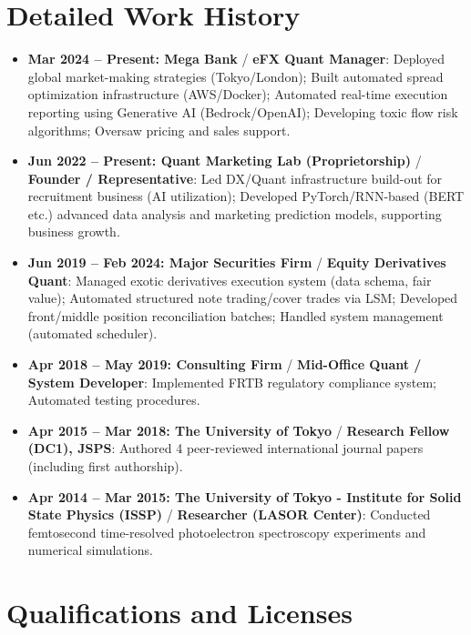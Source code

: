 \documentclass[uplatex,a4j,10.5pt,dvipdfmx]{jsarticle}
\begin{document}
\section{Detailed Work History}
\begin{itemize}[leftmargin=*]
	\item \textbf{Mar 2024 -- Present: Mega Bank} / \textbf{eFX Quant Manager}: Deployed global market-making strategies (Tokyo/London); Built automated spread optimization infrastructure (AWS/Docker); Automated real-time execution reporting using Generative AI (Bedrock/OpenAI); Developing toxic flow risk algorithms; Oversaw pricing and sales support.
	\item \textbf{Jun 2022 -- Present: Quant Marketing Lab (Proprietorship)} / \textbf{Founder / Representative}: Led DX/Quant infrastructure build-out for recruitment business (AI utilization); Developed PyTorch/RNN-based (BERT etc.) advanced data analysis and marketing prediction models, supporting business growth.
	\item \textbf{Jun 2019 -- Feb 2024: Major Securities Firm} / \textbf{Equity Derivatives Quant}: Managed exotic derivatives execution system (data schema, fair value); Automated structured note trading/cover trades via LSM; Developed front/middle position reconciliation batches; Handled system management (automated scheduler).
	\item \textbf{Apr 2018 -- May 2019: Consulting Firm} / \textbf{Mid-Office Quant / System Developer}: Implemented FRTB regulatory compliance system; Automated testing procedures.
	\item \textbf{Apr 2015 -- Mar 2018: The University of Tokyo} / \textbf{Research Fellow (DC1), JSPS}: Authored 4 peer-reviewed international journal papers (including first authorship).
	\item \textbf{Apr 2014 -- Mar 2015: The University of Tokyo - Institute for Solid State Physics (ISSP)} / \textbf{Researcher (LASOR Center)}: Conducted femtosecond time-resolved photoelectron spectroscopy experiments and numerical simulations.
\end{itemize}


\section{Qualifications and Licenses}
\end{document}
